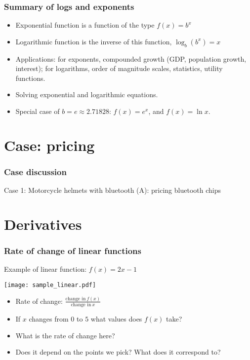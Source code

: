 \documentclass[xcolor=dvipsnames]{beamer} %
\begin{document}
\begin{frame}
\frametitle{Summary of logs and exponents}
\begin{itemize}
    \setlength\itemsep{1em}
\item Exponential function is a function of the type $f(x) = b^x$
\item Logarithmic function is the inverse of this function, $\log_b (b^x) = x$
\item Applications: for exponents, compounded growth (GDP, population growth, interest); for logarithms, order of magnitude scales, statistics, utility functions. 
\item Solving exponential and logarithmic equations. 
\item Special case of $b = e \approx 2.71828$: $f(x) = e^x$, and $f(x) = \ln x$.
\end{itemize}
\end{frame}

\section{Case: pricing}

\begin{frame}
\frametitle{Case discussion}

Case 1: Motorcycle helmets with bluetooth (A): pricing bluetooth chips
\end{frame}

\section{Derivatives}

\begin{frame}
\frametitle{Rate of change of linear functions}
Example of linear function: $f(x) = 2x -1$
\begin{center}
\texttt{[image: sample\_linear.pdf]}
\end{center}
\begin{itemize}
\item Rate of change: $ \frac{\textrm{change in}~f(x)}{\textrm{change in}~x}$
\item If $x$ changes from $0$ to $5$ what values does $f(x)$ take? 
\item What is the rate of change here? 
\item Does it depend on the points we pick? What does it correspond to?
\end{itemize}
\end{frame}
\end{document}
